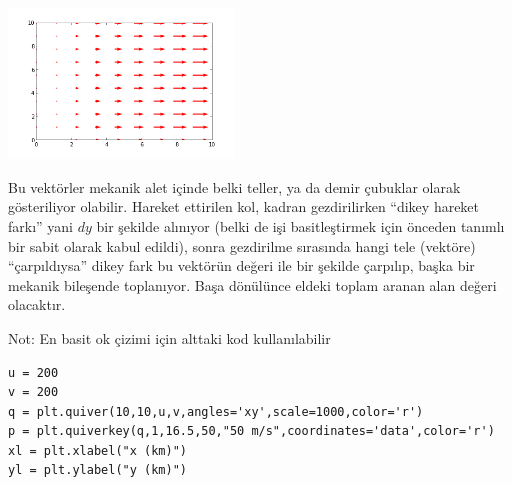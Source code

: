 \documentclass[12pt,fleqn]{article}\usepackage{../../common}
\begin{document}
\includegraphics[height=4cm]{field_x.png}

Bu vektörler mekanik alet içinde belki teller, ya da demir çubuklar olarak
gösteriliyor olabilir. Hareket ettirilen kol, kadran gezdirilirken ``dikey
hareket farkı'' yani $dy$ bir şekilde alınıyor (belki de işi basitleştirmek
için önceden tanımlı bir sabit olarak kabul edildi), sonra gezdirilme
sırasında hangi tele (vektöre) ``çarpıldıysa'' dikey fark bu vektörün
değeri ile bir şekilde çarpılıp, başka bir mekanik bileşende
toplanıyor. Başa dönülünce eldeki toplam aranan alan değeri olacaktır.

Not: En basit ok çizimi için alttaki kod kullanılabilir

\begin{verbatim}
u = 200
v = 200
q = plt.quiver(10,10,u,v,angles='xy',scale=1000,color='r')
p = plt.quiverkey(q,1,16.5,50,"50 m/s",coordinates='data',color='r')
xl = plt.xlabel("x (km)")
yl = plt.ylabel("y (km)")
\end{verbatim}
\end{document}
